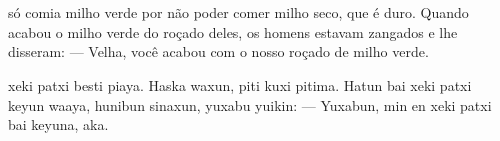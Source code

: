 \chapter*{}

\mbox{}\vspace*{\fill}



 só comia milho
verde por não poder comer
milho seco, que é duro.
Quando acabou o milho verde
do roçado deles, os homens
estavam zangados
e lhe disseram:
--- Velha, você acabou com o
nosso roçado de milho verde.

\vspace{2em}

 xeki patxi besti piaya.
Haska waxun, piti kuxi pitima.
Hatun bai xeki patxi keyun waaya,
hunibun sinaxun, yuxabu yuikin:
--- Yuxabun, min en xeki
patxi bai keyuna, aka.

\vspace*{\fill}

